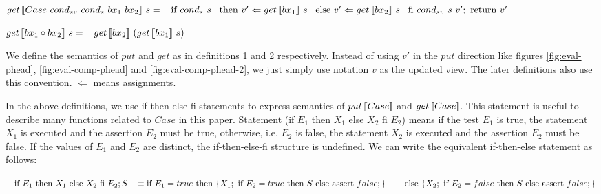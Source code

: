 \begin{multicols}{2}
\begin{definition}
        $\getbx{\casebx{cond_{sv}}{cond_{s}}{bx_1}{bx_2}}{s} = \\
            \tab \text{if} \ {cond_{s} \ s} \\
            \tab \text{then} \ v' \Leftarrow \getbx{bx_1}{s} \\ 
            \tab \text{else} \ v' \Leftarrow \getbx{bx_2}{s} \\ 
            \tab \text{fi} \ {cond_{sv} \ s \ v'}; \ \text{return} \ v'$

        $get \, [\![bx_1 \circ bx_2]\!] \ s = \\ 
            \hspace*{3mm} get \, [\![bx_2]\!] \ (get \, [\![bx_1]\!] \ s)$
    \end{definition}
\end{multicols}

We define the semantics of $put$ and $get$ as in definitions 1 and 2 respectively. Instead of using $v'$ in the $put$ direction like figures \ref{fig:eval-phead}, \ref{fig:eval-comp-phead} and \ref{fig:eval-comp-phead-2}, we just simply use notation $v$ as the updated view. The later definitions also use this convention. $\Leftarrow$ means assignments.

In the above definitions, we use if-then-else-fi statements to express semantics of $put \, [\![Case]\!]$ and $get \, [\![Case]\!]$. This statement is useful to describe many functions related to $Case$ in this paper. Statement (if $E_1$ then $X_1$ else $X_2$ fi $E_2$) means if the test $E_1$ is true, the statement $X_1$ is executed and the assertion $E_2$ must be true, otherwise, i.e. $E_2$ is false, the statement $X_2$ is executed and the assertion $E_2$ must be false. If the values of $E_1$ and $E_2$ are distinct, the if-then-else-fi structure is undefined. We can write the equivalent if-then-else statement as follows:

$\hspace*{3mm} \text{if } E_1 \text{ then } X_1 \text{ else } X_2 \text{ fi } E_2; S\\
\hspace*{3mm} \equiv \text{if }E_1 = true \text{ then } \{ X_1; \text{ if } E_2 = true \text{ then } S \text{ else assert } false; \}\\
    \hspace*{3mm} \ \quad \text{else } \{ X_2; \text{ if } E_2 = false \text{ then } S \text{ else assert } false; \}$



